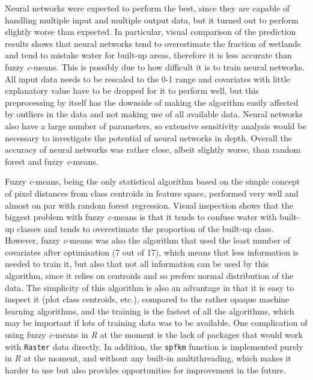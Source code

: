 \documentclass[a4paper,10pt]{book}
\begin{document}
Neural networks were expected to perform the best, since they are capable of handling multiple input and multiple output data, but it turned out to perform slightly worse than expected. In particular, visual comparison of the prediction results shows that neural networks tend to overestimate the fraction of wetlands and tend to mistake water for built-up areas, therefore it is less accurate than fuzzy \textit{c}-means. This is possibly due to how difficult it is to train neural networks. All input data needs to be rescaled to the 0-1 range and covariates with little explanatory value have to be dropped for it to perform well, but this preprocessing by itself has the downside of making the algorithm easily affected by outliers in the data and not making use of all available data. Neural networks also have a large number of parameters, so extensive sensitivity analysis would be necessary to investigate the potential of neural networks in depth. Overall the accuracy of neural networks was rather close, albeit slightly worse, than random forest and fuzzy \textit{c}-means.

Fuzzy \textit{c}-means, being the only statistical algorithm based on the simple concept of pixel distances from class centroids in feature space, performed very well and almost on par with random forest regression. Visual inspection shows that the biggest problem with fuzzy \textit{c}-means is that it tends to confuse water with built-up classes and tends to overestimate the proportion of the built-up class. However, fuzzy \textit{c}-means was also the algorithm that used the least number of covariates after optimisation (7 out of 17), which means that less information is needed to train it, but also that not all information can be used by this algorithm, since it relies on centroids and so prefers normal distribution of the data. The simplicity of this algorithm is also an advantage in that it is easy to inspect it (plot class centroids, etc.), compared to the rather opaque machine learning algorithms, and the training is the fastest of all the algorithms, which may be important if lots of training data was to be available. One complication of using fuzzy \textit{c}-means in \textit{R} at the moment is the lack of packages that would work with \texttt{Raster} data directly. In addition, the \texttt{spfkm} function is implemented purely in \textit{R} at the moment, and without any built-in multithreading, which makes it harder to use but also provides opportunities for improvement in the future.
\end{document}
